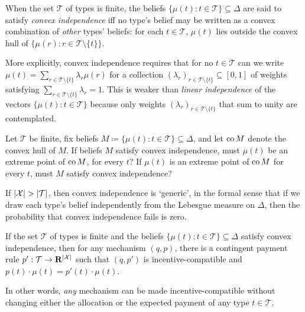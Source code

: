 \begin{definition}
	\label{definition:convex_indep}
	When the set $\mathcal{T}$ of types is finite,
	the beliefs $\{ \mu(t) : t \in \mathcal{T} \} \subseteq \Delta$
	are said to satisfy \emph{convex independence}
	iff no type's belief may be written as a convex combination of \emph{other} types' beliefs:
	for each $t \in \mathcal{T}$, $\mu(t)$ lies outside the convex hull of $\{ \mu(r) : r \in \mathcal{T} \setminus \{t\} \}$.
\end{definition}

More explicitly, convex independence requires that
for no $t \in \mathcal{T}$
can we write $\mu(t) = \sum_{r \in \mathcal{T} \setminus \{t\}} \lambda_r \mu(r)$
for a collection $( \lambda_r )_{r \in \mathcal{T} \setminus \{t\}} \subseteq [0,1]$ of weights satisfying $\sum_{r \in \mathcal{T} \setminus \{t\}} \lambda_r = 1$.
This is weaker than \emph{linear independence} of the vectors $\{ \mu(t) : t \in \mathcal{T} \}$ because only weights $( \lambda_r )_{r \in \mathcal{T} \setminus \{t\}}$ that sum to unity are contemplated.

\begin{exercise}
	\label{exercise:convex_indep_ext_point}
	Let $\mathcal{T}$ be finite,
	fix beliefs $M \coloneqq \{ \mu(t) : t \in \mathcal{T} \} \subseteq \Delta$,
	and let $\operatorname*{co} M$ denote the convex hull of $M$.
	If beliefs $M$ satisfy convex independence, must $\mu(t)$ be an extreme point of $\operatorname*{co} M$, for every $t$?
	If $\mu(t)$ is an extreme point of $\operatorname*{co} M$ for every $t$, must $M$ satisfy convex independence?
\end{exercise}

If $\abs*{\mathcal{X}} > \abs*{\mathcal{T}}$, then convex independence is `generic', in the formal sense that if we draw each type's belief independently from the Lebesgue measure on $\Delta$, then the probability that convex independence fails is zero.


\begin{theorem}
	\label{theorem:CremerMclean}
	If the set $\mathcal{T}$ of types is finite
	and the beliefs $\{ \mu(t) : t \in \mathcal{T} \} \subseteq \Delta$
	satisfy convex independence,
	then for any mechanism $(q,p)$,
	there is a contingent payment rule $p' : \mathcal{T} \to \R^{\abs*{\mathcal{X}}}$
	such that $(q,p')$ is incentive-compatible
	and $p(t) \cdot \mu(t) = p'(t) \cdot \mu(t)$.
\end{theorem}

In other words, \emph{any} mechanism can be made incentive-compatible
without changing either the allocation or the expected payment of any type $t \in \mathcal{T}$.

